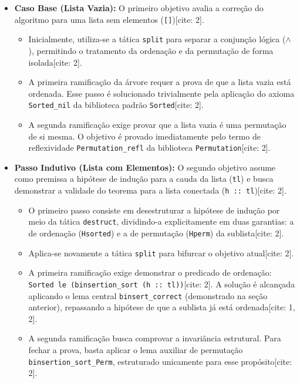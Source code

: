\documentclass{article}
\begin{document}
\begin{itemize}[leftmargin=*]
    \item \textbf{Caso Base (Lista Vazia):} O primeiro objetivo avalia a correção do algoritmo para uma lista sem elementos (\texttt{[]})[cite: 2].
    \begin{itemize}[leftmargin=*]
        \item Inicialmente, utiliza-se a tática \texttt{split} para separar a conjunção lógica ($\land$), permitindo o tratamento da ordenação e da permutação de forma isolada[cite: 2].
        \item A primeira ramificação da árvore requer a prova de que a lista vazia está ordenada. Esse passo é solucionado trivialmente pela aplicação do axioma \texttt{Sorted\_nil} da biblioteca padrão \texttt{Sorted}[cite: 2].
        \item A segunda ramificação exige provar que a lista vazia é uma permutação de si mesma. O objetivo é provado imediatamente pelo termo de reflexividade \texttt{Permutation\_refl} da biblioteca \texttt{Permutation}[cite: 2].
    \end{itemize}

    \item \textbf{Passo Indutivo (Lista com Elementos):} O segundo objetivo assume como premissa a hipótese de indução para a cauda da lista (\texttt{tl}) e busca demonstrar a validade do teorema para a lista conectada (\texttt{h :: tl})[cite: 2].
    \begin{itemize}[leftmargin=*]
        \item O primeiro passo consiste em desestruturar a hipótese de indução por meio da tática \texttt{destruct}, dividindo-a explicitamente em duas garantias: a de ordenação (\texttt{Hsorted}) e a de permutação (\texttt{Hperm}) da sublista[cite: 2].
        \item Aplica-se novamente a tática \texttt{split} para bifurcar o objetivo atual[cite: 2].
        \item A primeira ramificação exige demonstrar o predicado de ordenação: \texttt{Sorted le (binsertion\_sort (h :: tl))}[cite: 2]. A solução é alcançada aplicando o lema central \texttt{binsert\_correct} (demonstrado na seção anterior), repassando a hipótese de que a sublista já está ordenada[cite: 1, 2].
        \item A segunda ramificação busca comprovar a invariância estrutural. Para fechar a prova, basta aplicar o lema auxiliar de permutação \texttt{binsertion\_sort\_Perm}, estruturado unicamente para esse propósito[cite: 2].
    \end{itemize}
\end{itemize}
\end{document}
